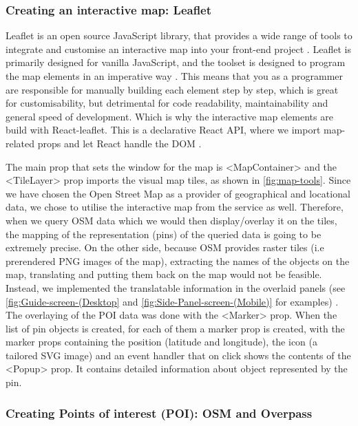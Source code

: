 \subsubsection{Creating an interactive map: Leaflet}

Leaflet is an open source JavaScript library, that provides a wide range of tools to integrate and customise an interactive map into your front-end project \cite{leafletMainPage}. Leaflet is primarily designed for vanilla JavaScript, and the toolset is designed to program the map elements in an imperative way \cite{LeafletImperative}. This means that you as a programmer are responsible for manually building each element step by step, which is great for customisability, but detrimental for code readability, maintainability and general speed of development. Which is why the interactive map elements are build with React-leaflet. This is a declarative React API, where we import map-related props and let React handle the DOM \cite{LeafletDeclarative}.

The main prop that sets the window for the map is <MapContainer> and the <TileLayer> prop imports the visual map tiles, as shown in \autoref{fig:map-tools}. Since we have chosen the Open Street Map as a provider of geographical and locational data, we chose to utilise the interactive map from the service as well. Therefore, when we query OSM data which we would then display/overlay it on the tiles, the mapping of the representation (pins) of the queried data is going to be extremely precise. On the other side, because OSM provides raster tiles (i.e prerendered PNG images of the map), extracting the names of the objects on the map, translating and putting them back on the map would not be feasible. Instead, we implemented the translatable information in the overlaid panels (see \autoref{fig:Guide-screen-(Desktop} and \autoref{fig:Side-Panel-screen-(Mobile)} for examples) . The overlaying of the POI data was done with the <Marker> prop. When the list of pin objects is created, for each of them a marker prop is created, with the marker props containing the position (latitude and longitude), the icon (a tailored SVG image) and an event handler that on click shows the contents of the <Popup> prop. It contains detailed information about object represented by the pin.

\subsubsection{Creating Points of interest (POI): OSM and Overpass}

